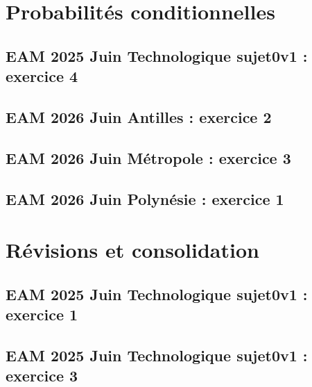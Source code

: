 \documentclass[lang=fr,edition=teacher,layout=sheet]{mxbook}
\begin{document}
\par\bigskip
\clearpage\section*{Probabilités conditionnelles}
\subsection*{EAM 2025 Juin Technologique sujet0v1 : exercice 4}
\begingroup\endgroup
\par\bigskip
{}\subsection*{EAM 2026 Juin Antilles : exercice 2}
\begingroup\endgroup
\par\bigskip
{}\subsection*{EAM 2026 Juin Métropole : exercice 3}
\begingroup\endgroup
\par\bigskip
{}\subsection*{EAM 2026 Juin Polynésie : exercice 1}
\begingroup\endgroup
\par\bigskip
\clearpage\section*{Révisions et consolidation}
\subsection*{EAM 2025 Juin Technologique sujet0v1 : exercice 1}
\begingroup\endgroup
\par\bigskip
{}\subsection*{EAM 2025 Juin Technologique sujet0v1 : exercice 3}
\end{document}
